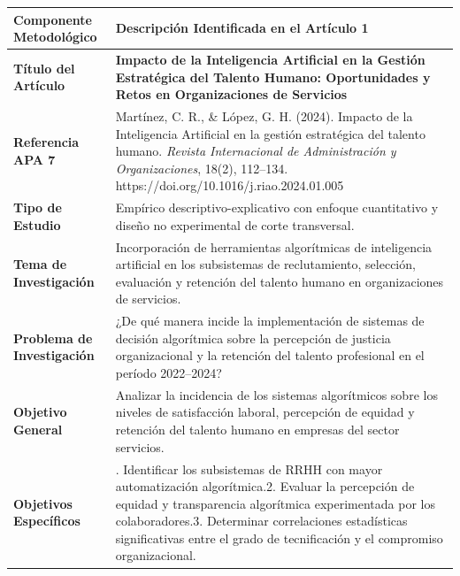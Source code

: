 \documentclass[
  spanish,
  letterpaper,
  DIV=11,
  numbers=noendperiod]{scrartcl}
\newcounter{none} %
\begin{document}
{\def\LTcaptype{none} %
\begin{longtable}[]{@{}
  >{\raggedright\arraybackslash}p{}
  >{\raggedright\arraybackslash}p{}@{}}
\toprule\noalign{}
\begin{minipage}[b]{\linewidth}\raggedright
Componente Metodológico
\end{minipage} & \begin{minipage}[b]{\linewidth}\raggedright
Descripción Identificada en el Artículo 1
\end{minipage} \\
\midrule\noalign{}
\endhead
\bottomrule\noalign{}
\endlastfoot
\textbf{Título del Artículo} & \textbf{Impacto de la Inteligencia
Artificial en la Gestión Estratégica del Talento Humano: Oportunidades y
Retos en Organizaciones de Servicios} \\
\textbf{Referencia APA 7} & Martínez, C. R., \& López, G. H. (2024).
Impacto de la Inteligencia Artificial en la gestión estratégica del
talento humano. \emph{Revista Internacional de Administración y
Organizaciones}, 18(2), 112--134.
https://doi.org/10.1016/j.riao.2024.01.005 \\
\textbf{Tipo de Estudio} & Empírico descriptivo-explicativo con enfoque
cuantitativo y diseño no experimental de corte transversal. \\
\textbf{Tema de Investigación} & Incorporación de herramientas
algorítmicas de inteligencia artificial en los subsistemas de
reclutamiento, selección, evaluación y retención del talento humano en
organizaciones de servicios. \\
\textbf{Problema de Investigación} & ¿De qué manera incide la
implementación de sistemas de decisión algorítmica sobre la percepción
de justicia organizacional y la retención del talento profesional en el
período 2022--2024? \\
\textbf{Objetivo General} & Analizar la incidencia de los sistemas
algorítmicos sobre los niveles de satisfacción laboral, percepción de
equidad y retención del talento humano en empresas del sector
servicios. \\
\textbf{Objetivos Específicos} & 1. Identificar los subsistemas de RRHH
con mayor automatización algorítmica.2. Evaluar la percepción de equidad
y transparencia algorítmica experimentada por los colaboradores.3.
Determinar correlaciones estadísticas significativas entre el grado de
tecnificación y el compromiso organizacional. \\

\end{longtable}}
\end{document}
